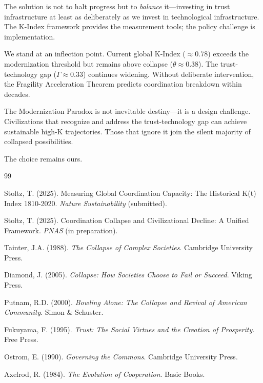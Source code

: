 \documentclass[11pt,a4paper]{article}
\begin{document}
The solution is not to halt progress but to \textit{balance} it---investing in trust infrastructure at least as deliberately as we invest in technological infrastructure. The K-Index framework provides the measurement tools; the policy challenge is implementation.

We stand at an inflection point. Current global K-Index ($\approx$0.78) exceeds the modernization threshold but remains above collapse ($\theta \approx 0.38$). The trust-technology gap ($\Gamma \approx 0.33$) continues widening. Without deliberate intervention, the Fragility Acceleration Theorem predicts coordination breakdown within decades.

The Modernization Paradox is not inevitable destiny---it is a design challenge. Civilizations that recognize and address the trust-technology gap can achieve sustainable high-K trajectories. Those that ignore it join the silent majority of collapsed possibilities.

The choice remains ours.


\begin{thebibliography}{99}

Stoltz, T. (2025). Measuring Global Coordination Capacity: The Historical K(t) Index 1810-2020. \textit{Nature Sustainability} (submitted).

Stoltz, T. (2025). Coordination Collapse and Civilizational Decline: A Unified Framework. \textit{PNAS} (in preparation).

Tainter, J.A. (1988). \textit{The Collapse of Complex Societies}. Cambridge University Press.

Diamond, J. (2005). \textit{Collapse: How Societies Choose to Fail or Succeed}. Viking Press.

Putnam, R.D. (2000). \textit{Bowling Alone: The Collapse and Revival of American Community}. Simon \& Schuster.

Fukuyama, F. (1995). \textit{Trust: The Social Virtues and the Creation of Prosperity}. Free Press.

Ostrom, E. (1990). \textit{Governing the Commons}. Cambridge University Press.

Axelrod, R. (1984). \textit{The Evolution of Cooperation}. Basic Books.

\end{thebibliography}
\end{document}

